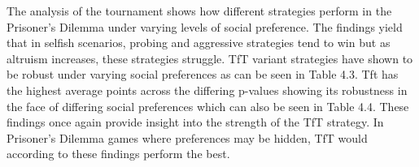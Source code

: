\documentclass[11pt,preprint]{elsarticle}
\let\origtable\table
\let\endorigtable\endtable
\renewenvironment{table}[1][2] {
    \expandafter\origtable\expandafter[H]
} {
    \endorigtable
}
\numberwithin{equation}{section}
\numberwithin{figure}{section}
\numberwithin{table}{section}
\begin{document}
The analysis of the tournament shows how different strategies perform in
the Prisoner's Dilemma under varying levels of social preference. The
findings yield that in selfish scenarios, probing and aggressive
strategies tend to win but as altruism increases, these strategies
struggle. TfT variant strategies have shown to be robust under varying
social preferences as can be seen in Table 4.3. Tft has the highest
average points across the differing p-values showing its robustness in
the face of differing social preferences which can also be seen in Table
4.4. These findings once again provide insight into the strength of the
TfT strategy. In Prisoner's Dilemma games where preferences may be
hidden, TfT would according to these findings perform the best.

\begin{table}[!h]
\centering
\caption{\label{tab:unnamed-chunk-7}Strategy Values Across Different p Values}
\centering
{}
\end{table}
\end{document}
